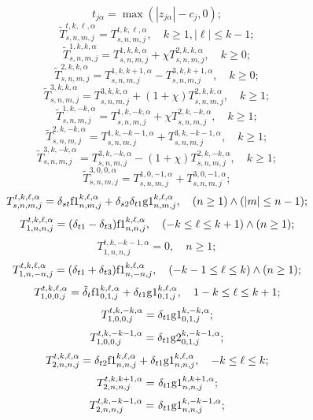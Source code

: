 \begin{russian}
\begin{theorem}
\begin{equation*}
{t_{j\alpha }} = \max (|{z_{j\alpha }}| - {c_j},0);
\end{equation*}
\begin{equation*}
\tilde T_{s,n,m,j}^{t,k,\ell ,\alpha } = T_{s,n,m,j}^{t,k,\ell ,\alpha },\quad k\ge 1, |\ell|\le k-1;
\end{equation*}
\begin{equation*}
\tilde T_{s,n,m,j}^{1,k,k,\alpha } = T_{s,n,m,j}^{1,k,k,\alpha } + \chi T_{s,n,m,j}^{2,k,k,\alpha },\quad k\ge 0;
\end{equation*}
\[\tilde T_{s,n,m,j}^{2,k,k,\alpha } = T_{s,n,m,j}^{1,k,k + 1,\alpha } - T_{s,n,m,j}^{3,k,k + 1,\alpha },\quad k\ge 0;\]
\[\tilde T_{s,n,m,j}^{3,k,k,\alpha } = T_{s,n,m,j}^{3,k,k,\alpha } + (1 + \chi )T_{s,n,m,j}^{2,k,k,\alpha },\quad k\ge 1;\]
\[\tilde T_{s,n,m,j}^{1,k, - k,\alpha } = T_{s,n,m,j}^{1,k, - k,\alpha } + \chi T_{s,n,m,j}^{2,k, - k,\alpha },\quad k\ge 1;\]
\[\tilde T_{s,n,m,j}^{2,k, - k,\alpha } = T_{s,n,m,j}^{1,k, - k - 1,\alpha } + T_{s,n,m,j}^{3,k, - k - 1,\alpha },\quad k\ge 1;\]
\[\tilde T_{s,n,m,j}^{3,k, - k,\alpha } = T_{s,n,m,j}^{3,k, - k,\alpha } - (1 + \chi )T_{s,n,m,j}^{2,k, - k,\alpha },\quad k\ge 1;\]
\[\tilde T_{s,n,m,j}^{3,0,0,\alpha } = T_{s,n,m,j}^{1,0, - 1,\alpha } + T_{s,n,m,j}^{3,0, - 1,\alpha };\]
\[T_{s,n,m,j}^{t,k,\ell ,\alpha } = {\delta _{st}}{\rm{f1}}_{n,m,j}^{k,\ell ,\alpha } + {\delta _{s2}}{\delta _{t1}}{\rm g1}_{n,m,j}^{k,\ell ,\alpha },\quad(n \ge 1) \wedge (\left| m \right| \le n - 1);\]
\[T_{1,n,n,j}^{t,k,\ell ,\alpha } = ({\delta _{t1}} - {\delta _{t3}}){\rm{f1}}_{n,n,j}^{k,\ell ,\alpha },\quad( - k \le \ell  \le k + 1) \wedge (n \ge 1);\]
\[T_{1,n,n,j}^{t,k, - k - 1,\alpha } = 0,\quad n\ge 1;\]
\[T_{1,n, - n,j}^{t,k,\ell ,\alpha } = ({\delta _{t1}} + {\delta _{t3}}){\rm{f1}}_{n, - n,j}^{k,\ell ,\alpha },\quad( - k - 1 \le \ell  \le k) \wedge (n \ge 1);\]
\[T_{1,0,0,j}^{t,k,\ell ,\alpha } = {\tilde \delta _t}{\rm{f1}}_{0,1,j}^{k,\ell ,\alpha } + {\delta _{t1}}{\rm g1}_{0,1,j}^{k,\ell ,\alpha },\quad 1 - k \le \ell  \le k + 1;\]
\[T_{1,0,0,j}^{t,k, - k,\alpha } = {\delta _{t1}}{\rm g1}_{0,1,j}^{k, - k,\alpha };\]
\[T_{1,0,0,j}^{t,k, - k - 1,\alpha } = {\delta _{t1}}{\rm g2}_{0,1,j}^{k, - k - 1,\alpha };\]
\[T_{2,n,n,j}^{t,k,\ell ,\alpha } = {\delta _{t2}}{\rm{f1}}_{n,n,j}^{k,\ell ,\alpha } + {\delta _{t1}}{\rm g1}_{n,n,j}^{k,\ell ,\alpha },\quad - k \le \ell  \le k;\]
\[T_{2,n,n,j}^{t,k, k + 1,\alpha } =  {\mkern 1mu} {\delta _{t1}}{\rm g1}_{n,n,j}^{k, k+1,\alpha };\]
\[T_{2,n,n,j}^{t,k, - k - 1,\alpha } =  {\mkern 1mu} {\delta _{t1}}{\rm g1}_{n,n,j}^{k, - k - 1,\alpha };\]

\end{theorem}
\end{russian}
